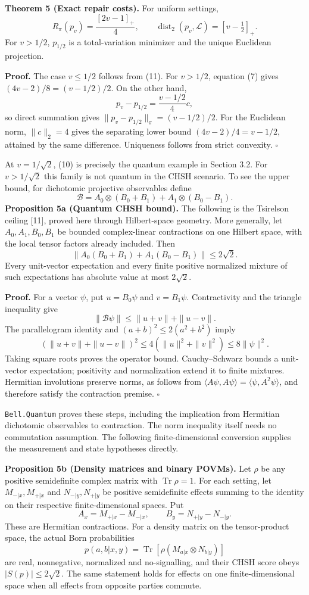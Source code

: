 \documentclass[
]{article}
\begin{document}
\textbf{Theorem 5 (Exact repair costs).} For uniform settings,
\[
R_\pi(p_v)=\frac{[2v-1]_+}{4},\qquad
\operatorname{dist}_2(p_v,\mathcal L)=[v-\tfrac12]_+.
\tag{12}
\]
For \(v>1/2\), \(p_{1/2}\) is a total-variation minimizer and the unique Euclidean projection.

\textbf{Proof.} The case \(v\le1/2\) follows from (11). For \(v>1/2\), equation (7) gives \((4v-2)/8=(v-1/2)/2\). On the other hand,
\[
p_v-p_{1/2}=\frac{v-1/2}{4}c,
\]
so direct summation gives \(\|p_v-p_{1/2}\|_\pi=(v-1/2)/2\). For the Euclidean norm, \(\|c\|_2=4\) gives the separating lower bound \((4v-2)/4=v-1/2\), attained by the same difference. Uniqueness follows from strict convexity. \(\square\)

At \(v=1/\sqrt2\), (10) is precisely the quantum example in Section 3.2. For \(v>1/\sqrt2\) this family is not quantum in the CHSH scenario. To see the upper bound, for dichotomic projective observables define
\[
\mathcal B=A_0\otimes(B_0+B_1)+A_1\otimes(B_0-B_1).
\]
\textbf{Proposition 5a (Quantum CHSH bound).} The following is the Tsirelson ceiling {[}11{]}, proved here through Hilbert-space geometry. More generally, let \(A_0,A_1,B_0,B_1\) be bounded complex-linear contractions on one Hilbert space, with the local tensor factors already included. Then
\[
\|A_0(B_0+B_1)+A_1(B_0-B_1)\|\le2\sqrt2.
\]
Every unit-vector expectation and every finite positive normalized mixture of such expectations has absolute value at most \(2\sqrt2\).

\textbf{Proof.} For a vector \(\psi\), put \(u=B_0\psi\) and \(v=B_1\psi\). Contractivity and the triangle inequality give
\[
\|\mathcal B\psi\|\le\|u+v\|+\|u-v\|.
\]
The parallelogram identity and \((a+b)^2\le2(a^2+b^2)\) imply
\[
(\|u+v\|+\|u-v\|)^2
\le4(\|u\|^2+\|v\|^2)\le8\|\psi\|^2.
\]
Taking square roots proves the operator bound. Cauchy--Schwarz bounds a unit-vector expectation; positivity and normalization extend it to finite mixtures. Hermitian involutions preserve norms, as follows from \(\langle A\psi,A\psi\rangle=\langle\psi,A^2\psi\rangle\), and therefore satisfy the contraction premise. \(\square\)

\texttt{Bell.Quantum} proves these steps, including the implication from Hermitian dichotomic observables to contraction. The norm inequality itself needs no commutation assumption. The following finite-dimensional conversion supplies the measurement and state hypotheses directly.

\textbf{Proposition 5b (Density matrices and binary POVMs).} Let \(\rho\) be any positive semidefinite complex matrix with \(\operatorname{Tr}\rho=1\). For each setting, let \(M_{-|x},M_{+|x}\) and \(N_{-|y},N_{+|y}\) be positive semidefinite effects summing to the identity on their respective finite-dimensional spaces. Put
\[
A_x=M_{+|x}-M_{-|x},\qquad B_y=N_{+|y}-N_{-|y}.
\]
These are Hermitian contractions. For a density matrix on the tensor-product space, the actual Born probabilities
\[
p(a,b|x,y)=\operatorname{Tr}\!\left[\rho(M_{a|x}\otimes N_{b|y})\right]
\]
are real, nonnegative, normalized and no-signalling, and their CHSH score obeys \(|S(p)|\le2\sqrt2\). The same statement holds for effects on one finite-dimensional space when all effects from opposite parties commute.
\end{document}
